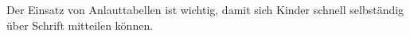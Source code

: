 Der Einsatz von Anlauttabellen ist wichtig, damit sich Kinder schnell selbständig über Schrift mitteilen können.